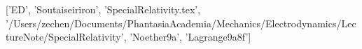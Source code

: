 ['ED', 'Soutaiseiriron', 'SpecialRelativity.tex', '/Users/zechen/Documents/PhantasiaAcademia/Mechanics/Electrodynamics/LectureNote/SpecialRelativity', 'Noether\xae\x9a', 'Lagrange\xaf{}\xba{}\x9a\x8f']
